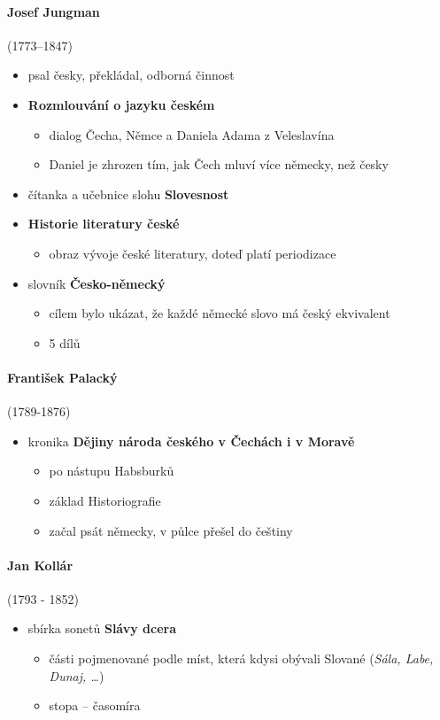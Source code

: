\paragraph{Josef Jungman} (1773--1847)
\begin{itemize}
\item psal česky, překládal, odborná činnost
\item \textbf{Rozmlouvání o jazyku českém}
	\begin{itemize}
	\item dialog Čecha, Němce a Daniela Adama z Veleslavína
	\item Daniel je zhrozen tím, jak Čech mluví více německy, než česky
	\end{itemize}
\item čítanka a učebnice slohu \textbf{Slovesnost}
\item \textbf{Historie literatury české}
	\begin{itemize}
	\item obraz vývoje české literatury, doteď platí periodizace	
	\end{itemize}
\item slovník \textbf{Česko-německý}
	\begin{itemize}
	\item cílem bylo ukázat, že každé německé slovo má český ekvivalent
	\item 5 dílů
	\end{itemize}
\end{itemize}

\paragraph{František Palacký} (1789-1876)
\begin{itemize}
\item kronika \textbf{Dějiny národa českého v Čechách i v Moravě}
	\begin{itemize}
	\item po nástupu Habsburků
	\item základ Historiografie
	\item začal psát německy, v půlce přešel do češtiny
	\end{itemize}
\end{itemize}

\paragraph{Jan Kollár}(1793 - 1852)
\begin{itemize}
\item sbírka sonetů \textbf{Slávy dcera}
	\begin{itemize}
	\item části pojmenované podle míst, která kdysi obývali Slované (\textit{Sála, Labe, Dunaj, \ldots})
	\item stopa -- časomíra
	\end{itemize}
\end{itemize}

